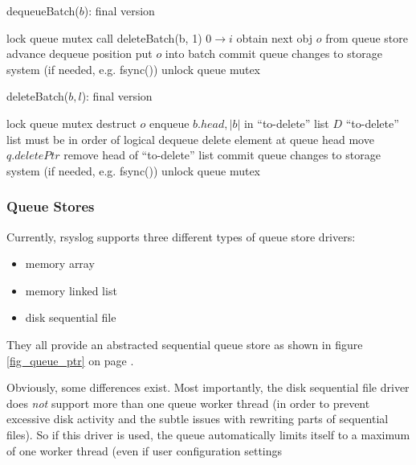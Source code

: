 \documentclass[a4paper,10pt]{article}
\begin{document}
\begin{algorithm}
\caption{dequeueBatch($b$): final version}
\begin{algorithmic}
\label{alg_deq_batch_final}
\STATE lock queue mutex
\STATE call deleteBatch(b, 1)
\STATE $0 \to i$
	\STATE obtain next obj $o$ from queue store 
	\STATE advance dequeue position
	\STATE put $o$ into batch
\ENDWHILE
\STATE commit queue changes to storage system (if needed, e.g. fsync())
\STATE unlock queue mutex
\end{algorithmic}
\end{algorithm}


\begin{algorithm}
\caption{deleteBatch($b, l$): final version}
\begin{algorithmic}
\label{alg_del_batch_final}
	\STATE lock queue mutex
\ENDIF
{}
	\STATE destruct $o$
\ENDFOR
\STATE enqueue $b.head, |b|$ in ``to-delete'' list $D$
\COMMENT ``to-delete'' list must be in order of logical dequeue
		\STATE delete element at queue head
		\STATE move $q.deletePtr$
	\ENDFOR
	\STATE remove head of ``to-delete'' list
\ENDWHILE 
\STATE commit queue changes to storage system (if needed, e.g. fsync())
	\STATE unlock queue mutex
\ENDIF
\end{algorithmic}
\end{algorithm}

\subsubsection{Queue Stores}
Currently, rsyslog supports three different types of queue store drivers:

\begin{itemize}
\item memory array
\item memory linked list
\item disk sequential file
\end{itemize}

They all provide an abstracted sequential queue store as shown in figure \ref{fig_queue_ptr} on page \pageref{fig_queue_ptr}.

Obviously, some differences exist. Most importantly, the disk sequential file driver does \emph{not} support more than one queue worker thread (in order to prevent excessive disk activity and the subtle issues with rewriting parts of sequential files). So if this driver is used, the queue automatically limits itself to a maximum of one worker thread (even if user configuration settings 
\end{document}
